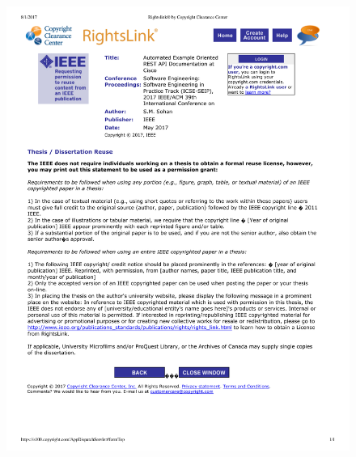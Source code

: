 \begin{figure}
 \centering
 \includegraphics[width=\textwidth]{copyrights/cisco_paper.pdf}
\end{figure}
